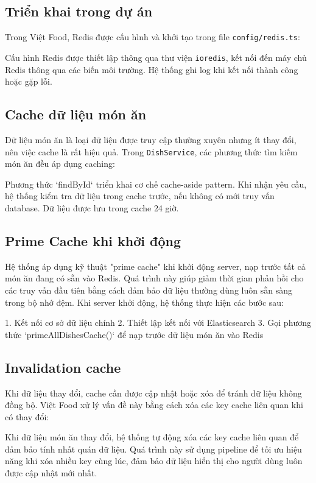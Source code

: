 \subsection{Triển khai trong dự án}
Trong Việt Food, Redis được cấu hình và khởi tạo trong file \texttt{config/redis.ts}:

Cấu hình Redis được thiết lập thông qua thư viện \texttt{ioredis}, kết nối đến máy chủ Redis thông qua các biến môi trường. Hệ thống ghi log khi kết nối thành công hoặc gặp lỗi.

\subsection{Cache dữ liệu món ăn}
Dữ liệu món ăn là loại dữ liệu được truy cập thường xuyên nhưng ít thay đổi, nên việc cache là rất hiệu quả. Trong \texttt{DishService}, các phương thức tìm kiếm món ăn đều áp dụng caching:

Phương thức `findById` triển khai cơ chế cache-aside pattern. Khi nhận yêu cầu, hệ thống kiểm tra dữ liệu trong cache trước, nếu không có mới truy vấn database. Dữ liệu được lưu trong cache 24 giờ.

\subsection{Prime Cache khi khởi động}
Hệ thống áp dụng kỹ thuật "prime cache" khi khởi động server, nạp trước tất cả món ăn đang có sẵn vào Redis. Quá trình này giúp giảm thời gian phản hồi cho các truy vấn đầu tiên bằng cách đảm bảo dữ liệu thường dùng luôn sẵn sàng trong bộ nhớ đệm. Khi server khởi động, hệ thống thực hiện các bước sau:

1. Kết nối cơ sở dữ liệu chính
2. Thiết lập kết nối với Elasticsearch
3. Gọi phương thức `primeAllDishesCache()` để nạp trước dữ liệu món ăn vào Redis

\subsection{Invalidation cache}
Khi dữ liệu thay đổi, cache cần được cập nhật hoặc xóa để tránh dữ liệu không đồng bộ. Việt Food xử lý vấn đề này bằng cách xóa các key cache liên quan khi có thay đổi:

Khi dữ liệu món ăn thay đổi, hệ thống tự động xóa các key cache liên quan để đảm bảo tính nhất quán dữ liệu. Quá trình này sử dụng pipeline để tối ưu hiệu năng khi xóa nhiều key cùng lúc, đảm bảo dữ liệu hiển thị cho người dùng luôn được cập nhật mới nhất.

